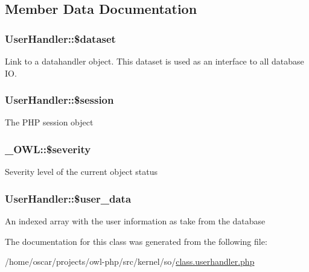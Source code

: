 \subsection{Member Data Documentation}
\subsubsection[{\$dataset}]{\setlength{\rightskip}{0pt plus 5cm}UserHandler::\$dataset}\label{classUserHandler_ac38c1ea50b2820ed03781bdbe8eb2e08}
Link to a datahandler object. This dataset is used as an interface to all database IO. 
\subsubsection[{\$session}]{\setlength{\rightskip}{0pt plus 5cm}UserHandler::\$session}\label{classUserHandler_af097b7fd1ee085b46a6c34e071508a7f}
The PHP session object 
\subsubsection[{\$severity}]{\setlength{\rightskip}{0pt plus 5cm}\_\-OWL::\$severity}\label{class__OWL_ad26b40a9dbbacb33e299b17826f8327c}
Severity level of the current object status 
\subsubsection[{\$user\_\-data}]{\setlength{\rightskip}{0pt plus 5cm}UserHandler::\$user\_\-data}\label{classUserHandler_ae7a2d59eee65560ac96b860e828bb445}
An indexed array with the user information as take from the database 

The documentation for this class was generated from the following file:\begin{DoxyCompactItemize}
\item 
/home/oscar/projects/owl-\/php/src/kernel/so/\hyperlink{class_8userhandler_8php}{class.userhandler.php}\end{DoxyCompactItemize}
